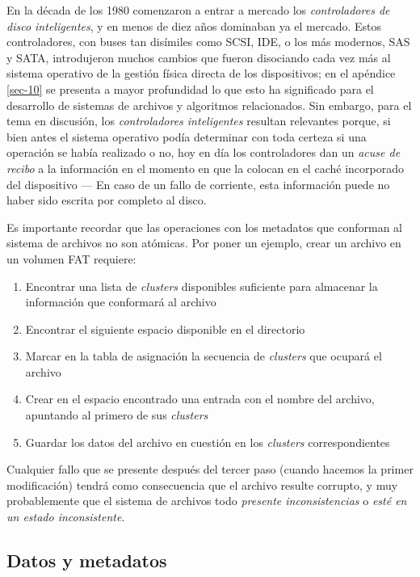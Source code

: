 \documentclass[11pt,fleqn]{book} %
\begin{document}
En la década de los 1980 comenzaron a entrar a mercado los
\emph{controladores de disco inteligentes}, y en menos de diez años
dominaban ya el mercado. Estos controladores, con buses tan disímiles
como SCSI, IDE, o los más modernos, SAS y SATA, introdujeron muchos
cambios que fueron disociando cada vez más al sistema operativo de la
gestión física directa de los dispositivos; en el apéndice
\ref{sec-10} se presenta a mayor profundidad lo que esto ha
significado para el desarrollo de sistemas de archivos y algoritmos
relacionados. Sin embargo, para el tema en discusión, los \emph{controladores inteligentes} resultan relevantes porque, si bien antes el sistema
operativo podía determinar con toda certeza si una operación se había
realizado o no, hoy en día los controladores dan un \emph{acuse de recibo}
a la información en el momento en que la colocan en el caché
incorporado del dispositivo — En caso de un fallo de corriente, esta
información puede no haber sido escrita por completo al disco.

Es importante recordar que las operaciones con los metadatos que conforman al
sistema de archivos no son atómicas. Por poner un ejemplo, crear un
archivo en un volumen FAT requiere:

\begin{enumerate}
\item Encontrar una lista de \emph{clusters} disponibles suficiente para
   almacenar la información que conformará al archivo
\item Encontrar el siguiente espacio disponible en el directorio
\item Marcar en la tabla de asignación la secuencia de \emph{clusters} que
   ocupará el archivo
\item Crear en el espacio encontrado una entrada con el nombre del
   archivo, apuntando al primero de sus \emph{clusters}
\item Guardar los datos del archivo en cuestión en los \emph{clusters}
   correspondientes
\end{enumerate}

Cualquier fallo que se presente después del tercer paso (cuando
hacemos la primer modificación) tendrá como consecuencia que el
archivo resulte corrupto, y muy probablemente que el sistema de
archivos todo \emph{presente inconsistencias} o \emph{esté en un estado inconsistente}.
\subsection{Datos y metadatos}
\label{sec-7-3-1}
\end{document}
